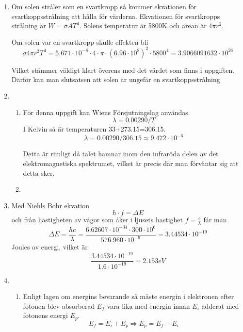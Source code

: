 \documentclass[a4paper,12pt]{article}
\begin{document}
\begin{enumerate}
      \item Om solen stråler som en svartkropp så kommer ekvationen för
            svartkoppsstrålning att hålla för värderna.
            Ekvationen för svartkropps strålning är $W=\sigma A T^4$.
            Solens temperatur är 5800K och arean är $4\pi r^2$.

            Om solen var en svartkropp skulle effekten bli
            $$\sigma 4\pi r^2T^4=5.671\cdot 10^{-8} \cdot 4 \cdot \pi \cdot (6.96\cdot 10^8)^2\cdot 5800^4=3.9066091632\cdot 10^{26}$$

            Vilket stämmer väldigt klart överens med det värdet som finns i uppgiften. Därför
            kan man slutsatsen att solen är ungefär en svartkoppsstrålning

      \item
            \begin{enumerate}
                  \item För denna uppgift kan Wiens Försjutningslag användas.
                        $$\lambda=0.00290/T$$
                        I Kelvin så är temperaturen 33+273.15=306.15.
                        $$\lambda=0.00290/306.15\approx 9.472\cdot 10^{-6}$$

                        Detta är rimligt då talet hamnar inom den infraröda delen
                        av det elektromagnetiska spektrumet, vilket är precis där
                        man förväntar sig att detta sker.

                  \item
            \end{enumerate}


      \item Med Niehls Bohr ekvation
            $$h\cdot f =\Delta E$$
            och från hastigheten av vågor som åker i ljusets hastighet
            $f=\frac{c}{\lambda}$ får man
            $$\Delta E=\frac{hc}{\lambda}=\frac{6.62607\cdot 10^{-34}\cdot 300\cdot 10^6}{576.960\cdot 10^{-9}}=3.44534\cdot 10^{-19}$$
            Joules av energi, vilket är
            $$\frac{3.44534\cdot 10^{-19}}{1.6\cdot 10^{-19}}=2.153 eV$$

      \item
            \begin{enumerate}
                  \item Enligt lagen om energins bevarande så måste
                        energin i elektronen efter fotonen blev absorberad $E_f$ vara lika med
                        energin innan $E_i$ adderat med fotonens energi $E_p$.
                        $$E_f=E_i+E_p\Rightarrow E_p=E_f-E_i$$


\end{enumerate}
\end{enumerate}
\end{document}
